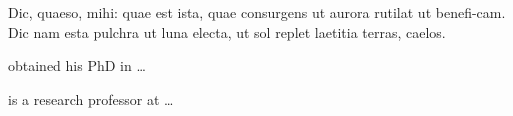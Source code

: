 \documentclass{infor}
\theoremstyle{remark}
\begin{document}
\begin{funding}
Dic, quaeso, mihi: quae est ista, quae consurgens ut aurora rutilat
ut benefi-cam.  Dic nam esta pulchra ut luna electa, ut sol replet
laetitia terras, caelos.
\end{funding}



\vfill

\begin{biography}\label{bio1}
\author{F. Surname1} obtained his PhD in \ldots
\end{biography}

\begin{biography}\label{bio2}
\author{S. Surname2} is a research professor at \ldots
\end{biography}
\end{document}
